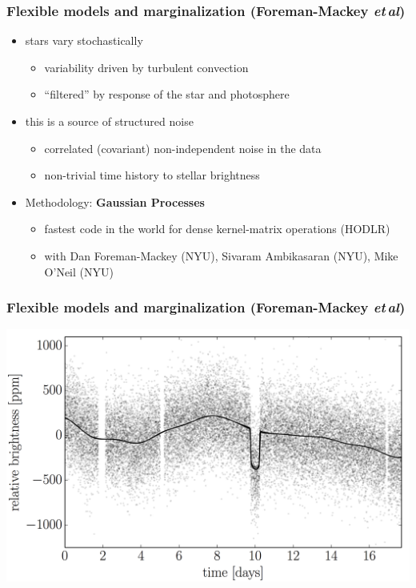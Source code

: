 \documentclass{beamer}
\newcommand{\foreign}[1]{\textsl{#1}}
\newcommand{\etal}{\foreign{et\,al}}
\renewcommand{\emph}[1]{\textbf{#1}}
\begin{document}
\begin{frame}
  \frametitle{Flexible models and marginalization \small{(Foreman-Mackey \etal)}}
  \begin{itemize}
  \item stars vary stochastically
    \begin{itemize}
    \item variability driven by turbulent convection
    \item ``filtered'' by response of the star and photosphere
    \end{itemize}
  \item this is a source of structured noise
    \begin{itemize}
    \item correlated (covariant) non-independent noise in the data
    \item non-trivial time history to stellar brightness
    \end{itemize}
  \item Methodology: \emph{Gaussian Processes}
    \begin{itemize}
    \item fastest code in the world for dense kernel-matrix operations (HODLR)
    \item with Dan Foreman-Mackey (NYU), Sivaram Ambikasaran (NYU), Mike O'Neil (NYU)
    \end{itemize}
  \end{itemize}
\end{frame}

\begin{frame}
  \frametitle{Flexible models and marginalization \small{(Foreman-Mackey \etal)}}
  \includegraphics[width=\textwidth]{kepler-prediction.png}
\end{frame}
\end{document}

